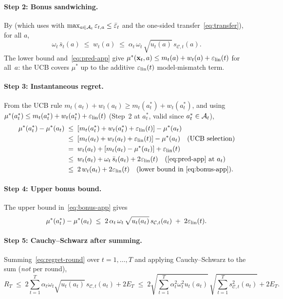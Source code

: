 \documentclass[twoside]{article}
\newcommand{\Calg}{\mathcal{C}}                 %
\begin{document}
\paragraph{Step 2: Bonus sandwiching.}
By  (which uses  with
$\max_{a\in\mathcal{A}_t}\varepsilon_{t,a}\le\bar\varepsilon_t$ and the one-sided
transfer~\eqref{eq:transfer}), for all $a$,
\begin{equation}\label{eq:bonus-app}
  \omega_t\,\bar s_t(a)
  \;\le\;
  w_t(a)
  \;\le\;
  \alpha_t\,\omega_t\,\sqrt{u_t(a)}\,s_{\Calg,t}(a).
\end{equation}
The lower bound and~\eqref{eq:pred-app} give
$\mu^*(\mathbf{x}_t,a)\le m_t(a)+w_t(a)+\varepsilon_{\mathrm{lin}}(t)$ for all~$a$: the UCB covers
$\mu^*$ up to the additive $\varepsilon_{\mathrm{lin}}(t)$ model-mismatch term.

\paragraph{Step 3: Instantaneous regret.}
From the UCB rule $m_t(a_t)+w_t(a_t)\ge m_t(a_t^*)+w_t(a_t^*)$, and using
$\mu^*(a_t^*)\le m_t(a_t^*)+w_t(a_t^*)+\varepsilon_{\mathrm{lin}}(t)$ (Step~2 at $a_t^*$, valid
since $a_t^*\in\mathcal{A}_t$),
\begin{align*}
  \mu^*(a_t^*)-\mu^*(a_t)
  &\;\le\; [m_t(a_t^*)+w_t(a_t^*)+\varepsilon_{\mathrm{lin}}(t)] - \mu^*(a_t) \\
  &\;\le\; [m_t(a_t)+w_t(a_t)+\varepsilon_{\mathrm{lin}}(t)] - \mu^*(a_t)
    \quad\text{(UCB selection)} \\
  &\;=\; w_t(a_t) + [m_t(a_t)-\mu^*(a_t)] + \varepsilon_{\mathrm{lin}}(t) \\
  &\;\le\; w_t(a_t) + \omega_t\,\bar s_t(a_t) + 2\varepsilon_{\mathrm{lin}}(t)
    \quad\text{(\eqref{eq:pred-app} at $a_t$)} \\
  &\;\le\; 2\,w_t(a_t) + 2\varepsilon_{\mathrm{lin}}(t)
    \quad\text{(lower bound in~\eqref{eq:bonus-app})}.
\end{align*}

\paragraph{Step 4: Upper bonus bound.}
The upper bound in~\eqref{eq:bonus-app} gives
\begin{equation}\label{eq:regret-round}
  \mu^*(a_t^*)-\mu^*(a_t)
  \;\le\;
  2\,\alpha_t\,\omega_t\,\sqrt{u_t(a_t)}\,s_{\Calg,t}(a_t)
  \;+\; 2\epslin(t).
\end{equation}

\paragraph{Step 5: Cauchy--Schwarz after summing.}
Summing~\eqref{eq:regret-round} over $t=1,\dots,T$ and applying
Cauchy--Schwarz to the sum (\emph{not} per round),
\[
  R_T
  \;\le\;
  2\sum_{t=1}^T \alpha_t\omega_t\sqrt{u_t(a_t)}\,s_{\Calg,t}(a_t) + 2E_T
  \;\le\;
  2\sqrt{\sum_{t=1}^T \alpha_t^2\omega_t^2 u_t(a_t)}\,
  \sqrt{\sum_{t=1}^T s_{\Calg,t}^2(a_t)} + 2E_T .
\]
\end{document}
